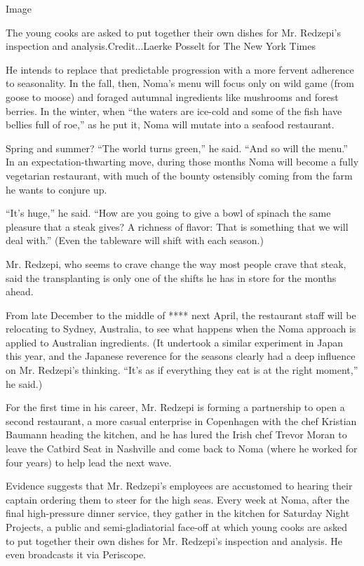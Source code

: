 Image

The young cooks are asked to put together their own dishes for Mr.
Redzepi's inspection and analysis.Credit...Laerke Posselt for The New
York Times

He intends to replace that predictable progression with a more fervent
adherence to seasonality. In the fall, then, Noma's menu will focus only
on wild game (from goose to moose) and foraged autumnal ingredients like
mushrooms and forest berries. In the winter, when ``the waters are
ice-cold and some of the fish have bellies full of roe,'' as he put it,
Noma will mutate into a seafood restaurant.

Spring and summer? ``The world turns green,'' he said. ``And so will the
menu.'' In an expectation-thwarting move, during those months Noma will
become a fully vegetarian restaurant, with much of the bounty ostensibly
coming from the farm he wants to conjure up.

``It's huge,'' he said. ``How are you going to give a bowl of spinach
the same pleasure that a steak gives? A richness of flavor: That is
something that we will deal with.'' (Even the tableware will shift with
each season.)

Mr. Redzepi, who seems to crave change the way most people crave that
steak, said the transplanting is only one of the shifts he has in store
for the months ahead.

From late December to the middle of **** next April, the restaurant
staff will be relocating to Sydney, Australia, to see what happens when
the Noma approach is applied to Australian ingredients. (It undertook a
similar experiment in Japan this year, and the Japanese reverence for
the seasons clearly had a deep influence on Mr. Redzepi's thinking.
``It's as if everything they eat is at the right moment,'' he said.)

For the first time in his career, Mr. Redzepi is forming a partnership
to open a second restaurant, a more casual enterprise in Copenhagen with
the chef Kristian Baumann heading the kitchen, and he has lured the
Irish chef Trevor Moran to leave the Catbird Seat in Nashville and come
back to Noma (where he worked for four years) to help lead the next
wave.

Evidence suggests that Mr. Redzepi's employees are accustomed to hearing
their captain ordering them to steer for the high seas. Every week at
Noma, after the final high-pressure dinner service, they gather in the
kitchen for Saturday Night Projects, a public and semi-gladiatorial
face-off at which young cooks are asked to put together their own dishes
for Mr. Redzepi's inspection and analysis. He even broadcasts it via
Periscope.

